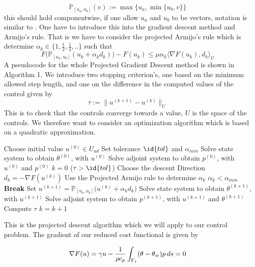 \begin{equation}
    \label{eq:projection}
    \mathbb{P}_{[u_a,u_b]}(v) := \max \{u_a, \min \{u_b,v \} \}
\end{equation}
this should hold componentwise, if one allow $u_a$ and $u_b$ to be vectors, notation is similar to \cite{Algorithms}. One have to introduce this into the gradient descent method and Armijo's rule. That is we have to consider the projected Armijo's rule which is determine $\alpha_k \in \{1, \frac{1}{2},\frac{1}{4},.. \}$ such that 
\begin{equation*}
    F \bigg (\mathbb{P}_{[u_a,u_b]}(u_k + \alpha_kd_k) \bigg ) - F(u_k) \leq \mu \alpha_k \langle \nabla F(u_k),d_k \rangle_{U}
\end{equation*}
A pseudocode for the whole Projected Gradient Descent method is shown in Algorithm 1. We introduce two stopping criterion's, one based on the minimum allowed step length, and one on the difference in the computed values of the control given by 
\begin{equation}
    \label{eq:stopping}
    \tau := \|u^{(k+1)} - u^{(k)}\|_U 
\end{equation}
This is to check that the controls converge towards a value, $U$ is the space of the controls. We therefore want to consider an optimization algorithm which is based on a quadratic approximation. 

\begin{codebox}
\li Choose initial value $u^{(0)}\in U_{ad}$
\li Set tolerance $\id{tol}$ and $\alpha_{min}$
\li Solve state system to obtain $\theta^{(0)}$, with $u^{(0)}$
\li Solve adjoint system to obtain $p^{(0)}$, with $u^{(0)}$ and $p^{(0)}$
\li $k=0$
\li \While ($\tau > \id{tol}$)  \Then
\li Choose the descent Direction $d_k = -\nabla F(u^{(k)})$
\li Use the Projected Armijo rule to determine $\alpha_k$
\li \If $\alpha_k < \alpha_{min}$ \Then 
\li \textbf{Break} \End
\li Set $u^{(k+1)} = \mathbb{P}_{[u_a,u_b]}\bigg (u^{(k)} + \alpha_k d_k \bigg )$
\li Solve state system to obtain $\theta^{(k+1)}$, with $u^{(k+1)}$
\li Solve adjoint system to obtain $p^{(k+1)}$, with $u^{(k+1)}$ and $\theta^{(k+1)}$
\li Compute $\tau$
\li $k = k +1$
\end{codebox}
This is the projected descent algorithm which we will apply to our control problem. The gradient of our reduced cost functional is given by

\begin{equation*}
    \nabla F(u) =  \gamma u - \frac{1}{\rho c_p} \int_{\Gamma_1} (\theta - \theta_w)p \mathop{ds} = 0
\end{equation*}


